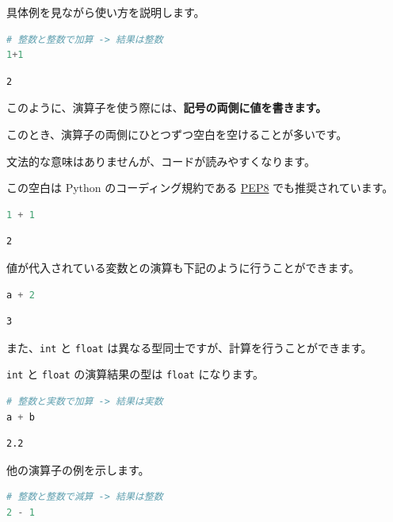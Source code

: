 具体例を見ながら使い方を説明します。


\begin{lstlisting}[style=codecell,language=Python]
# 整数と整数で加算 -> 結果は整数
1+1
\end{lstlisting}

\begin{lstlisting}[style=outputcell]
2
\end{lstlisting}

このように、演算子を使う際には、\textbf{記号の両側に値を書きます。}

このとき、演算子の両側にひとつずつ空白を空けることが多いです。

文法的な意味はありませんが、コードが読みやすくなります。

この空白は Python のコーディング規約である \href{https://www.python.org/dev/peps/pep-0008/#should-a-line-break-before-or-after-a-binary-operator}{PEP8} でも推奨されています。


\begin{lstlisting}[style=codecell,language=Python]
1 + 1
\end{lstlisting}

\begin{lstlisting}[style=outputcell]
2
\end{lstlisting}

値が代入されている変数との演算も下記のように行うことができます。


\begin{lstlisting}[style=codecell,language=Python]
a + 2
\end{lstlisting}

\begin{lstlisting}[style=outputcell]
3
\end{lstlisting}

また、\texttt{int} と \texttt{float} は異なる型同士ですが、計算を行うことができます。

\texttt{int} と \texttt{float} の演算結果の型は \texttt{float} になります。


\begin{lstlisting}[style=codecell,language=Python]
# 整数と実数で加算 -> 結果は実数
a + b
\end{lstlisting}

\begin{lstlisting}[style=outputcell]
2.2
\end{lstlisting}

他の演算子の例を示します。


\begin{lstlisting}[style=codecell,language=Python]
# 整数と整数で減算 -> 結果は整数
2 - 1
\end{lstlisting}

